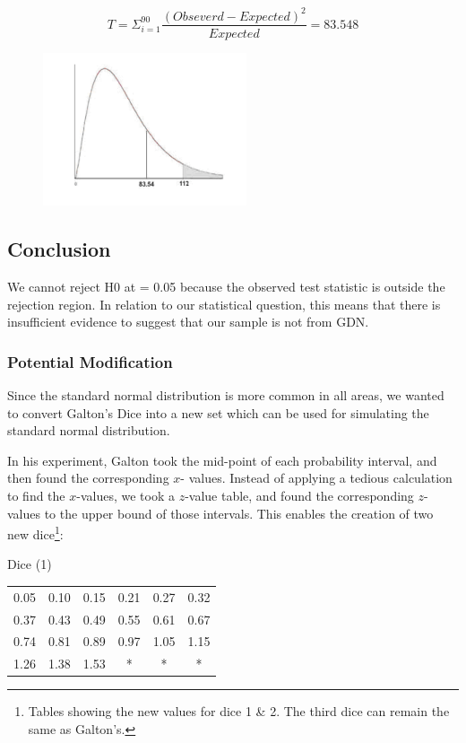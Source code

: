 $$T=\Sigma_{i=1}^{90} \frac{(Obseverd-Expected)^2}{Expected} = 83.548$$

\begin{figure}[thp]
\begin{center}
\includegraphics[width=6cm]{figures/GaltonDice_chisquare.pdf}
\end{center}
\end{figure}
 

\subsection{Conclusion}
We cannot reject H0 at   = 0.05 because the observed test statistic is outside the rejection region. In relation to our statistical question, this means that there is insufficient evidence to suggest that our sample is not from GDN. 

 
\subsubsection*{Potential Modification}
Since the standard normal distribution is more common in all areas, we wanted to convert Galton's Dice into a new set which can be used for simulating the standard normal distribution. 

In his experiment, Galton took the mid-point of each probability interval, and then found the corresponding $x$- values. Instead of applying a tedious calculation to find the $x$-values, we took a $z$-value table, and found the corresponding $z$-values to the upper bound of those intervals. This enables the creation of two new dice\footnote{Tables showing the new values for dice 1 \& 2. The third dice can remain the same as Galton's.}:
\newline

Dice (1)
\begin{tabular}{|cccccc|}\hline
0.05	&0.10	&0.15&	0.21&	0.27&	0.32\\
0.37&	0.43&	0.49&	0.55&	0.61&	0.67\\
0.74	&0.81&	0.89&	0.97&	1.05&	1.15\\
1.26	&1.38	&1.53& 	*&	*&	*\\\hline
\end{tabular}


